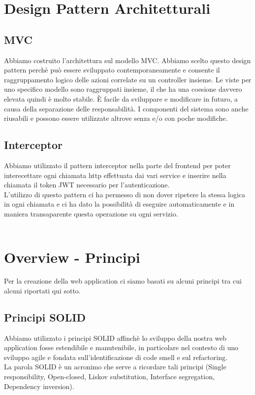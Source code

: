 \documentclass{article}
\begin{document}
\section{Design Pattern Architetturali}
\subsection{MVC}
Abbiamo costruito l'architettura sul modello MVC. Abbiamo scelto questo design pattern perchè può essere sviluppato contemporaneamente e consente il raggruppamento logico delle azioni correlate su un controller insieme. Le viste per uno specifico modello sono raggruppati insieme, il che ha una coesione davvero elevata quindi è molto stabile. È facile da sviluppare e modificare in futuro, a causa della separazione delle responsabilità. I componenti del sistema sono anche riusabili e possono essere utilizzate altrove senza e/o con poche modifiche.

\subsection{Interceptor}
Abbiamo utilizzato il pattern interceptor nella parte del frontend per poter interecettare ogni chiamata http effettuata dai vari service e inserire nella chiamata il token JWT necessario per l’autenticazione.\\
L’utilizzo di questo pattern ci ha permesso di non dover ripetere la stessa logica in ogni chiamata e ci ha dato la possibilità di eseguire automaticamente e in maniera transaparente questa operazione su ogni servizio.  \\
\\
\section{Overview - Principi}
Per la creazione della web application ci siamo basati su alcuni principi tra cui alcuni riportati qui sotto.
\subsection{Principi SOLID}
Abbiamo utilizzato i principi SOLID affinchè lo sviluppo della nostra web application fosse estendibile e manutenibile, in particolare nel contesto di  uno sviluppo agile e fondata sull’identificazione di code smell e sul refactoring.\\
La parola SOLID è un acronimo che serve a ricordare tali principi (Single responsibility, Open-closed, Liskov substitution, Interface segregation, Dependency inversion).
\end{document}
